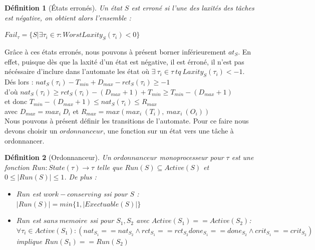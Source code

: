 \documentclass[11pt,a4paper,oneside]{book}
\theoremstyle{break}
\newtheorem{defin}{Définition}
\theoremstyle{breakplain}
\begin{document}
\begin{defin}[États erronés]
\label{failstate}
Un état $S$ est erroné si l'une des laxités des tâches est négative, on obtient alors l'ensemble :

$Fail_\tau = \{S|\exists \tau_i \in \tau : WorstLaxity_S(\tau_i) < 0  \}$\\
\end{defin}

Grâce à ces états erronés, nous pouvons à présent borner inférieurement $at_S$. En effet, puisque dès que la laxité d'un état est négative, il est érroné, il n'est pas nécéssaire d'inclure dans l'automate les état où $\exists\ \tau_i \in \tau\ tq\ Laxity_S(\tau_i) < -1$.\\
Dés lors : $nat_S(\tau_i) -T_{min} + D_{max} - rct_S(\tau_i) \geq -1$\\
d'où $nat_S(\tau_i) \geq rct_S(\tau_i) - (D_{max}+1) + T_{min} \geq T_{min}-(D_{max}+1)$\\
et donc $T_{min}-(D_{max}+1) \leq nat_S(\tau_i) \leq R_{max}$\\
avec $D_{max} = max_i\ D_i$ et $R_{max} = max(max_i\ (T_i),\ max_i\ (O_i))$\\

Nous pouvons à présent définir les transitions de l'automate. Pour ce faire nous devons choisir un $ordonnanceur$, une fonction sur un état vers une tâche à ordonnancer.

\begin{defin}[Ordonnanceur]
\label{run}
Un $ordonnanceur$ monoprocesseur pour $\tau$ est une fonction $Run : State(\tau) \rightarrow \tau$ telle que $Run(S) \subseteq Active(S)$ et $0 \leq |Run(S)| \leq 1$.
De plus :
\begin{itemize}
\item $Run$ est $work-conserving$ ssi pour $S$ : $ |Run(S)| = min\{1, |Exectuable(S)|\}$
\item $Run$ est $sans\ memoire$ ssi pour $S_1,S_2$ avec $Active(S_1) == Active(S_2)$:
$\forall \tau_i \in Active(S_1) : (nat_{S_1} == nat_{S_2} \wedge rct_{S_1} == rct_{S_2} done_{S_1} == done_{S_2} \wedge crit_{S_1} == crit_{S_2} )$ implique $Run(S_1) == Run(S_2)$
\end{itemize}

\end{defin}
\end{document}
